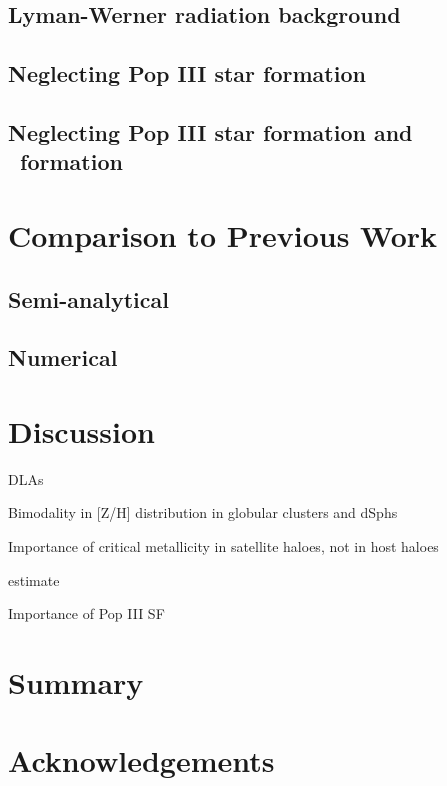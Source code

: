 \documentclass[useAMS,usenatbib]{mn2e}
\begin{document}
\subsection{Lyman-Werner radiation background}

\subsection{Neglecting Pop III star formation}

\subsection{Neglecting Pop III star formation and \hh~formation}

\section{Comparison to Previous Work}
\label{sec:compare}

\subsection{Semi-analytical}

\subsection{Numerical}

\section{Discussion}
\label{sec:discuss}

\li DLAs

\li Bimodality in [Z/H] distribution in globular clusters and dSphs

\li Importance of critical metallicity in satellite haloes, not in host
haloes

\li [$\alpha$/Fe] estimate

\li Importance of Pop III SF

\section{Summary}
\label{sec:summary}

\section*{Acknowledgements}
\end{document}
